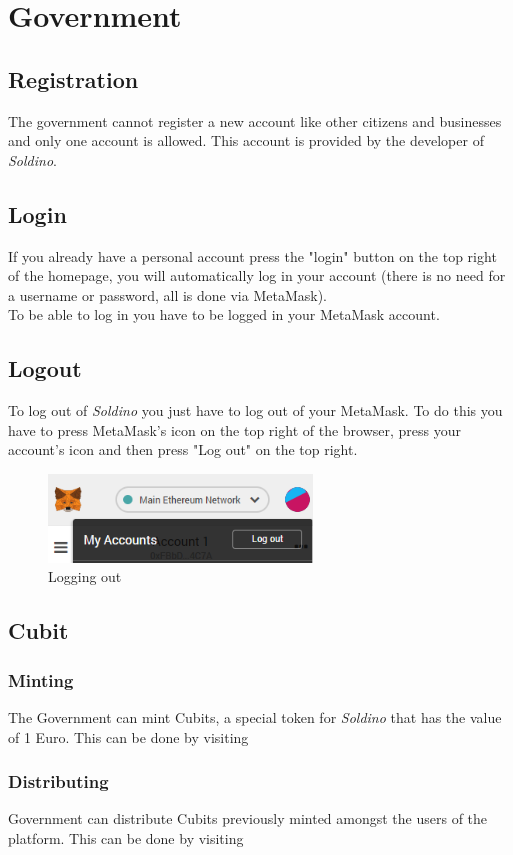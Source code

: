 \section{Government}
	\subsection{Registration}
	The government cannot register a new account like other citizens and 
	businesses and only one account is allowed. This account is provided 
	by the developer of \textit{Soldino}.
	\subsection{Login}
	If you already have a personal account press the "login" button on the 
	top right of the homepage, you will automatically log in your account 
	(there is no need for a username or password, all is done via MetaMask). 
	\\To be able to log in you have to be logged in your MetaMask account.
	\subsection{Logout}
	To log out of \textit{Soldino} you just have to log out of 
	your MetaMask. To do this you have to press MetaMask's icon on the top 
	right of the browser, press your account's icon and then press "Log out"
	on the top right.
	\begin{figure}[H]
		\includegraphics[width=7cm]{res/images/logout_metamask.png}
		\centering
		\caption{Logging out}
	\end{figure}
	\subsection{Cubit}
		\subsubsection{Minting}
		The Government can mint Cubits, a special token for \textit{Soldino} 
		that has the value of 1 Euro. This can be done by visiting 
		
		\subsubsection{Distributing}
		Government can distribute Cubits previously minted amongst the users of 
		the platform. This can be done by visiting 
		
